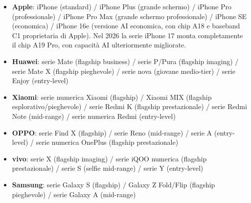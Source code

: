 
\begin{itemize}
  \item \textbf{Apple}: iPhone (standard) / iPhone Plus (grande schermo) / iPhone Pro (professionale) / iPhone Pro Max (grande schermo professionale) / iPhone SE (economica) / iPhone 16e (versione AI economica, con chip A18 e baseband C1 proprietaria di Apple). Nel 2026 la serie iPhone 17 monta completamente il chip A19 Pro, con capacità AI ulteriormente migliorate.
  \item \textbf{Huawei}: serie Mate (flagship business) / serie P/Pura (flagship imaging) / serie Mate X (flagship pieghevole) / serie nova (giovane medio-tier) / serie Enjoy (entry-level)
  \item \textbf{Xiaomi}: serie numerica Xiaomi (flagship) / Xiaomi MIX (flagship esplorativo/pieghevole) / serie Redmi K (flagship prestazionale) / serie Redmi Note (mid-range) / serie numerica Redmi (entry-level)
  \item \textbf{OPPO}: serie Find X (flagship) / serie Reno (mid-range) / serie A (entry-level) / serie numerica OnePlus (flagship prestazionale)
  \item \textbf{vivo}: serie X (flagship imaging) / serie iQOO numerica (flagship prestazionale) / serie S (selfie mid-range) / serie Y (entry-level)
  \item \textbf{Samsung}: serie Galaxy S (flagship) / Galaxy Z Fold/Flip (flagship pieghevole) / serie Galaxy A (mid-range)
\end{itemize}


